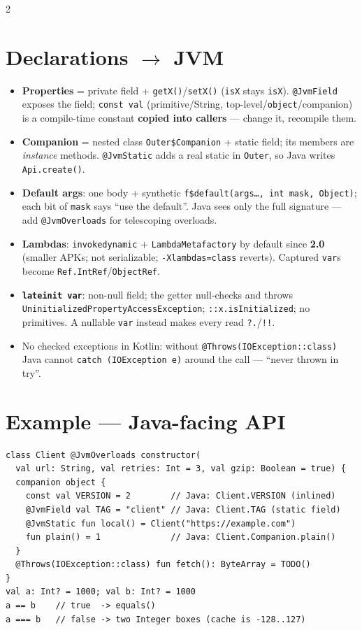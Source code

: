 \documentclass[8pt]{extarticle}
\newcommand\bb{\texttt{\hbox{!}\hbox{!}}}
\newcommand\sq{\texttt{\hbox{?}\hbox{.}}}
\newcommand\cc{\texttt{\hbox{:}\hbox{:}}}
\begin{document}
\begin{multicols}{2}
\raggedright

\section{Declarations $\to$ JVM}
\begin{itemize}\raggedright
  \item \textbf{Properties} = private field + \texttt{getX()}/\texttt{setX()} (\texttt{isX}
        stays \texttt{isX}). \texttt{@JvmField} exposes the field; \texttt{const val}
        (primitive/String, top-level/\texttt{object}/companion) is a compile-time constant
        \textbf{copied into callers} — change it, recompile them.
  \item \textbf{Companion} = nested class \texttt{Outer\$Companion} + static field; its
        members are \emph{instance} methods. \texttt{@JvmStatic} adds a real static in
        \texttt{Outer}, so Java writes \texttt{Api.create()}.
  \item \textbf{Default args}: one body + synthetic \texttt{f\$default(args…, int mask,
        Object)}; each bit of \texttt{mask} says ``use the default''. Java sees only the full
        signature — add \texttt{@JvmOverloads} for telescoping overloads.
  \item \textbf{Lambdas}: \texttt{invokedynamic} + \texttt{LambdaMetafactory} by default
        since \textbf{2.0} (smaller APKs; not serializable; \texttt{-Xlambdas=class} reverts).
        Captured \texttt{var}s become \texttt{Ref.IntRef}/\texttt{ObjectRef}.
  \item \textbf{\texttt{lateinit var}}: non-null field; the getter null-checks and throws
        \texttt{UninitializedPropertyAccessException}; \cc\texttt{x.isInitialized}; no
        primitives. A nullable \texttt{var} instead makes every read \sq/\bb.
  \item No checked exceptions in Kotlin: without \texttt{@Throws(IOException}\cc\texttt{class)} Java
        cannot \texttt{catch (IOException e)} around the call — ``never thrown in try''.
\end{itemize}

\section{Example — Java-facing API}
\begin{lstlisting}[language=KotlinSheet]
class Client @JvmOverloads constructor(
  val url: String, val retries: Int = 3, val gzip: Boolean = true) {
  companion object {
    const val VERSION = 2        // Java: Client.VERSION (inlined)
    @JvmField val TAG = "client" // Java: Client.TAG (static field)
    @JvmStatic fun local() = Client("https://example.com")
    fun plain() = 1              // Java: Client.Companion.plain()
  }
  @Throws(IOException::class) fun fetch(): ByteArray = TODO()
}
val a: Int? = 1000; val b: Int? = 1000
a == b    // true  -> equals()
a === b   // false -> two Integer boxes (cache is -128..127)
\end{lstlisting}


\end{multicols}
\end{document}

